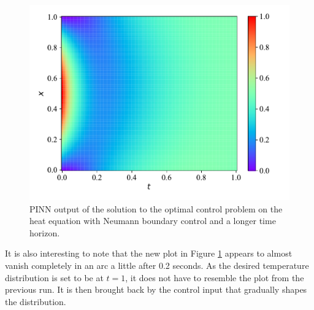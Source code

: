\begin{figure}[H]
    \centering
    \includegraphics[width=1.0\linewidth]{Figures/IntermediateExperiments/OptimalControl/heat_neumann_longer/heat1d_optimal_control_boundary1.pdf}
    \caption{PINN output of the solution to the optimal control problem on the heat equation with Neumann boundary control and a longer time horizon.}
    \label{fig:heat1d_optimal_control_boundary1_longer}
\end{figure}

It is also interesting to note that the new plot in Figure \ref{fig:heat1d_optimal_control_boundary1_longer} appears to almost vanish completely in an arc a little after 0.2 seconds. As the desired temperature distribution is set to be at $t = 1$, it does not have to resemble the plot from the previous run. It is then brought back by the control input that gradually shapes the distribution.

